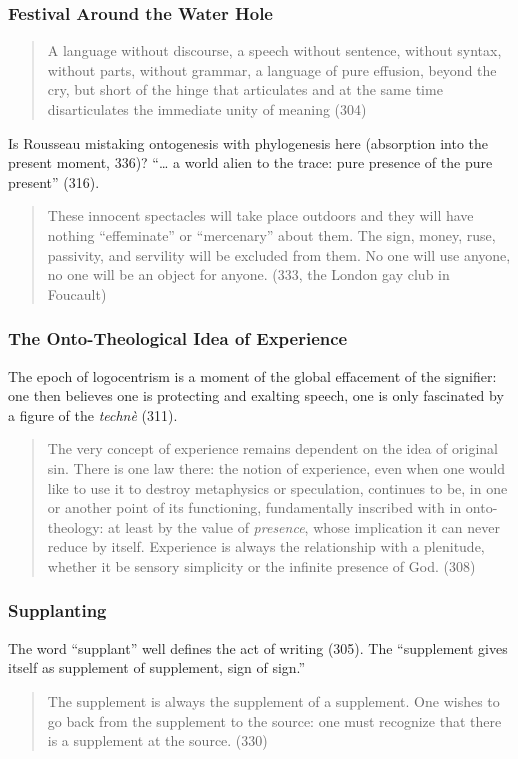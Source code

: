 \documentclass[xcolor=dvipsnames]{beamer}
\begin{document}
\begin{frame}
  \frametitle{Festival Around the Water Hole}
  \begin{quote}
    A language without discourse, a speech without sentence, without
    syntax, without parts, without grammar, a language of pure
    effusion, beyond the cry, but short of the hinge that articulates
    and at the same time disarticulates the immediate unity of meaning
    (304)
  \end{quote}
  Is Rousseau mistaking ontogenesis with phylogenesis here (absorption
  into the present moment, 336)? ``{\ldots} a world alien to the
  trace: pure presence of the pure present'' (316).
      \begin{quote}
        These innocent spectacles will take place outdoors and they
        will have nothing ``effeminate'' or ``mercenary'' about them.
        The sign, money, ruse, passivity, and servility will be
        excluded from them. No one will use anyone, no one will be an
        object for anyone. (333, the London gay club in Foucault)
      \end{quote}
\end{frame}

\begin{frame}
  \frametitle{The Onto-Theological Idea of Experience}
      The epoch of logocentrism is a moment of the global effacement
      of the signifier: one then believes one is protecting and
      exalting speech, one is only fascinated by a figure of the
      \emph{techn{\`e}} (311).
  \begin{quote}
    The very concept of experience remains dependent on the
    idea of original sin. There is one law there: the notion of
    experience, even when one would like to use it to destroy
    metaphysics or speculation, continues to be, in one or another
    point of its functioning, fundamentally inscribed with in onto-theology:
    at least by the value of \emph{presence}, whose implication
    it can never reduce by itself. Experience is always the
    relationship with a plenitude, whether it be sensory simplicity
    or the infinite presence of God. (308)
  \end{quote}
\end{frame}

\begin{frame}
  \frametitle{Supplanting}
  The word ``supplant'' well defines the act of writing (305). The
  ``supplement gives itself as supplement of supplement, sign of
  sign.'' 
  \begin{quote}
    The supplement is always the supplement of a supplement. One
    wishes to go back from the supplement to the source: one must
    recognize that there is a supplement at the source. (330)
  \end{quote}
\end{frame}
\end{document}
